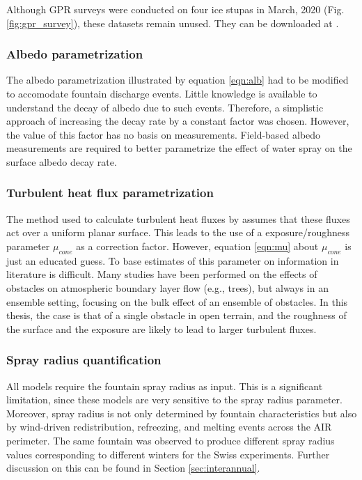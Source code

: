 Although \ac{GPR} surveys were conducted on four ice stupas in March, 2020 (Fig. \ref{fig:gpr_survey}),
these datasets remain unused. They can be downloaded at \citet{balasubramanian_suryanarayanan_2022_7056646}.

\subsubsection{Albedo parametrization}

The albedo parametrization illustrated by equation \ref{eqn:alb} had to be modified to accomodate fountain
discharge events. Little knowledge is available to understand the decay of albedo due to such events. Therefore,
a simplistic approach of increasing the decay rate by a constant factor was chosen. However, the value of this
factor has no basis on measurements. Field-based albedo measurements are required to better
parametrize the effect of water spray on the surface albedo decay rate.

\subsubsection{Turbulent heat flux parametrization}

The method used to calculate turbulent heat fluxes by \citet{garrattAtmosphericBoundaryLayer1992} assumes that
these fluxes act over a uniform planar surface. This leads to the use of a exposure/roughness parameter
$\mu_{cone}$ as a correction factor. However, equation \ref{eqn:mu} about $\mu_{cone}$ is just an
educated guess. To base estimates of this parameter on information in literature is difficult. Many studies
have been performed on the effects of obstacles on atmospheric boundary layer flow (e.g., trees), but always in
an ensemble setting, focusing on the bulk effect of an ensemble of obstacles. In this thesis, the case is that of a single
obstacle in open terrain, and the roughness of the surface and the exposure are likely to lead to
larger turbulent fluxes.

\subsubsection{Spray radius quantification}

All models require the fountain spray radius as input. This is a significant limitation, since
these models are very sensitive to the spray radius parameter. Moreover, spray radius is not only determined by
fountain characteristics but also by wind-driven redistribution, refreezing, and melting events across
the \ac{AIR} perimeter. The same fountain was observed to produce different spray radius values corresponding to different
winters for the Swiss experiments. Further discussion on this can be found in Section \ref{sec:interannual}.

